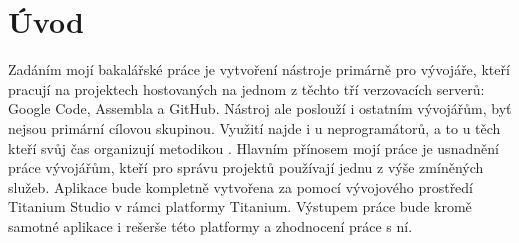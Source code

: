 \chapter{Úvod}

Zadáním mojí bakalářské práce je vytvoření nástroje primárně pro vývojáře, kteří pracují na projektech hostovaných na jednom z těchto tří verzovacích serverů: Google Code\cite{gcode}, Assembla\cite{assembla} a GitHub\cite{github}. Nástroj ale poslouží i ostatním vývojářům, byť nejsou primární cílovou skupinou. Využití najde i u neprogramátorů, a to u těch kteří svůj čas organizují metodikou \cite{gtd:web}. Hlavním přínosem mojí práce je usnadnění práce vývojářům, kteří pro správu projektů používají jednu z výše zmíněných služeb. Aplikace bude kompletně vytvořena za pomocí vývojového prostředí Titanium Studio\cite{titanium} v rámci platformy Titanium. Výstupem práce bude kromě samotné aplikace i rešerše této platformy a zhodnocení práce s ní.